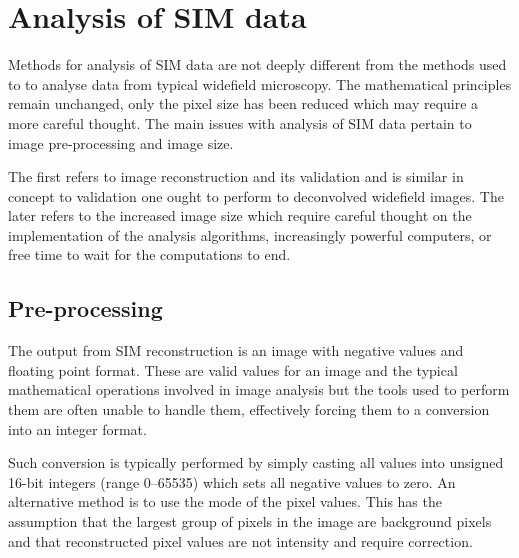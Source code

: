 \section{Analysis of SIM data}

  Methods for analysis of SIM data are not deeply different from the
  methods used to to analyse data from typical widefield microscopy. The
  mathematical principles remain unchanged, only the pixel size has been
  reduced which may require a more careful thought.  The main issues with
  analysis of SIM data pertain to image pre-processing and image size.

  The first refers to image reconstruction and its validation and is similar
  in concept to validation one ought to perform to deconvolved widefield
  images. The later refers to the increased image size which require
  careful thought on the implementation of the analysis algorithms,
  increasingly powerful computers, or free time to wait for the
  computations to end.


  \subsection{Pre-processing}
    The output from SIM reconstruction is an image with negative values
    and floating point format.  These are valid values for an image and
    the typical mathematical operations involved in image analysis but
    the tools used to perform them are often unable to handle them,
    effectively forcing them to a conversion into an integer format.


    Such conversion is typically performed by simply casting all values
    into unsigned 16-bit integers (range 0--65535) which sets all negative
    values to zero. An alternative method is to use the mode of the pixel
    values.  This has the assumption that the largest group of pixels in
    the image are background pixels and that reconstructed pixel values
    are not intensity and require correction.


